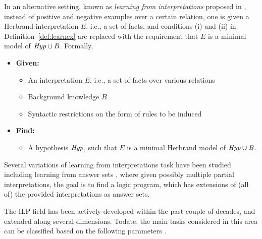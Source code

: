In an alternative setting, known as \emph{learning from interpretations} proposed in \cite{DBLP:journals/ai/RaedtD94}, instead of positive and negative examples over a certain relation, one is given a Herbrand interpretation $E$, i.e., a set of facts, and conditions (i) and (ii) in Definition~\ref{def:learnex} are replaced with the requirement that $E$ is a minimal model of $\mathit{Hyp} \cup B$.
Formally, 
\begin{definition}\label{def:learnint}
\begin{itemize}
\item[] \textbf{Given:}
\begin{itemize}
\item An interpretation $E$, i.e., a set of facts over various relations
\item Background knowledge $B$
\item Syntactic restrictions on the form of rules to be induced
\end{itemize}
\smallskip

\item[] \textbf{Find:}
\begin{itemize}
\item A hypothesis $\mathit{Hyp}$, such that $E$ is a minimal Herbrand model of $\mathit{Hyp \cup B}$.
\end{itemize}
\end{itemize}
\end{definition}

Several variations of learning from interpretations task have been studied including learning from answer sets \cite{DBLP:journals/tocl/Sakama05,DBLP:journals/ai/LawRB18}, where given possibly multiple partial interpretations, the goal is to find a logic program, which has extensions of (all of) the provided interpretations as answer sets.

The ILP field has been actively developed within the past couple of decades, and extended along several dimensions.
Todate, the main tasks considered in this area can be classified based on the following parameters \cite{DBLP:conf/semweb/SazonauS17,Boytcheva2007OverviewOI}.






